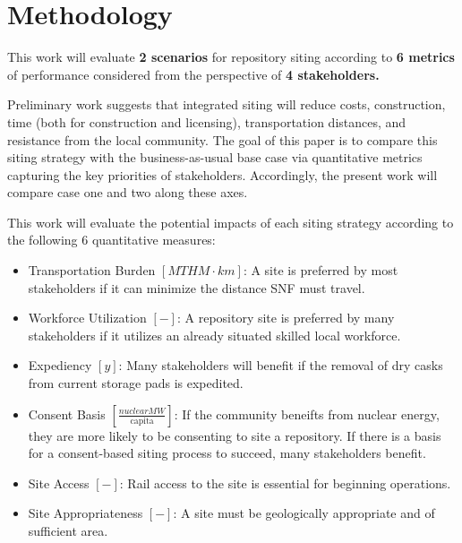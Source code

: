 \section{Methodology}

This work will evaluate \textbf{2 scenarios} for repository siting according to \textbf{6 metrics} of 
performance considered from the perspective of \textbf{4 stakeholders.}

Preliminary work \cite{waleed_regional_2015} suggests that integrated siting 
will reduce costs, construction, time (both for construction and licensing), 
transportation distances, and resistance from the local community.  
The goal of this paper is to compare this siting strategy with the 
business-as-usual base case via quantitative metrics capturing the key 
priorities of stakeholders. Accordingly, the present 
work will compare case one and two along these axes. 

This work will evaluate the potential impacts of each siting strategy according 
to the following 6 quantitative measures:

\begin{itemize}
	\item Transportation Burden $[MTHM \cdot km]$: A site is preferred by 
	most stakeholders if it can minimize the distance \gls{SNF} 
	must travel.
	\item Workforce Utilization $[-]$: A repository site is preferred by 
	many stakeholders if it utilizes an already situated skilled local 
	workforce. 
	\item Expediency $[y]$: Many stakeholders will benefit if the removal 
	of dry casks from current storage pads is expedited.
	\item Consent Basis $[\frac{nuclear MW}{\mbox{capita}}]$: If the community
	 beneifts from nuclear energy, they are more likely to be consenting to
	 site a repository. If there is a basis for a consent-based 
	siting process to succeed, many stakeholders benefit.
	\item Site Access $[-]$: Rail access to the site is essential for 
	beginning operations.
	\item Site Appropriateness $[-]$: A site must be geologically 
	appropriate and of sufficient area.
\end{itemize}

